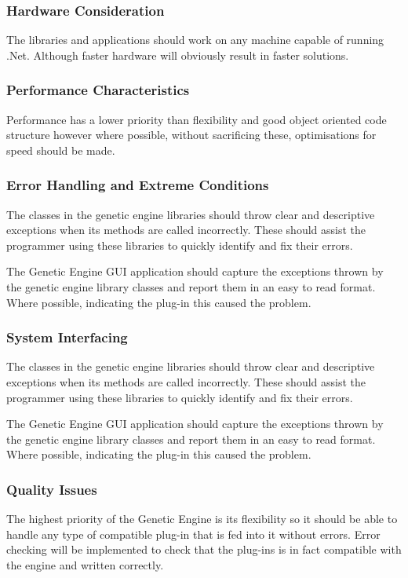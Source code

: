 \begin{enumerate}
\subsubsection{Hardware Consideration}
The libraries and applications should work on any machine capable of running .Net. Although faster hardware will obviously result in faster solutions.

\subsubsection{Performance Characteristics}
Performance has a lower priority than flexibility and good object oriented code structure however where possible, without sacrificing these, optimisations for speed should be made.

\subsubsection{Error Handling and Extreme Conditions}
The classes in the genetic engine libraries should throw clear and descriptive exceptions when its methods are called incorrectly. These should assist the programmer using these libraries to quickly identify and fix their errors.

The Genetic Engine GUI application should capture the exceptions thrown by the genetic engine library classes and report them in an easy to read format. Where possible, indicating the plug-in this caused the problem.

\subsubsection{System Interfacing}
The classes in the genetic engine libraries should throw clear and descriptive exceptions when its methods are called incorrectly. These should assist the programmer using these libraries to quickly identify and fix their errors.

The Genetic Engine GUI application should capture the exceptions thrown by the genetic engine library classes and report them in an easy to read format. Where possible, indicating the plug-in this caused the problem.

\subsubsection{Quality Issues}
The highest priority of the Genetic Engine is its flexibility so it should be able to handle any type of compatible plug-in that is fed into it without errors. Error checking will be implemented to check that the plug-ins is in fact compatible with the engine and written correctly.


\end{enumerate}
